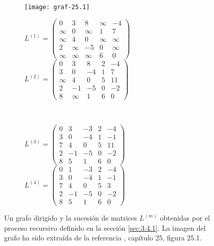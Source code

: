 \begin{figure}[htb]
	\centering
	\begin{subfigure}{\linewidth}
		\texttt{[image: graf-25.1]}
	\end{subfigure}

	\begin{subfigure}{\linewidth}
	$L^{(1)}=\begin{pmatrix}
		0 & 3 & 8 & \infty & -4\\
		\infty & 0 & \infty & 1 & 7 \\
		\infty & 4 & 0 & \infty & \infty \\
		2 & \infty & -5 & 0 & \infty \\
		\infty & \infty & \infty & 6 & 0
	\end{pmatrix}$
	$L^{(2)}=\begin{pmatrix}
		0 & 3 & 8 & 2 & -4\\
		3 & 0 & -4 & 1 & 7 \\
		\infty & 4 & 0 & 5 & 11 \\
		2 & -1 & -5 & 0 & -2 \\
		8 & \infty & 1 & 6 & 0
	\end{pmatrix}$
	\end{subfigure} \\
	\vspace{0.5cm}
	\begin{subfigure}{\linewidth}
	$L^{(3)}=\begin{pmatrix}
		0 & 3 & -3 & 2 & -4\\
		3 & 0 & -4 & 1 & -1 \\
		7 & 4 & 0 & 5 & 11 \\
		2 & -1 & -5 & 0 & -2 \\
		8 & 5 & 1 & 6 & 0
	\end{pmatrix}$
	$L^{(4)}=\begin{pmatrix}
		0 & 1 & -3 & 2 & -4\\
		3 & 0 & -4 & 1 & -1 \\
		7 & 4 & 0 & 5 & 3 \\
		2 & -1 & -5 & 0 & -2 \\
		8 & 5 & 1 & 6 & 0
	\end{pmatrix}$
	\end{subfigure}
	\caption{Un grafo dirigido y la sucesión de matrices $L^{(m)}$ obtenidas por el proceso recursivo definido en la sección \ref{sec:3.4.1}. La imagen del grafo ha sido extraída de la referencia \cite{algorithms}, capítulo 25, figura 25.1.}
	\label{fig:3.4.1}
\end{figure}

